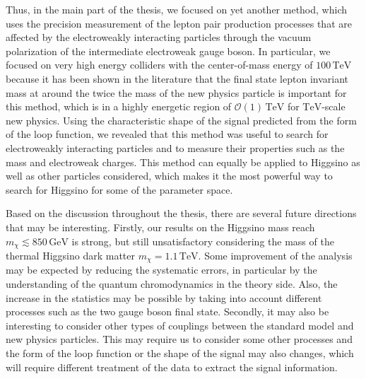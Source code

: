 \documentclass[12pt,twoside,book]{article}
\begin{document}
Thus, in the main part of the thesis, we focused on yet another method, which uses the precision measurement of the lepton pair production processes that are affected by the electroweakly interacting particles through the vacuum polarization of the intermediate electroweak gauge boson.
In particular, we focused on very high energy colliders with the center-of-mass energy of $100\,\mathrm{TeV}$ because it has been shown in the literature that the final state lepton invariant mass at around the twice the mass of the new physics particle is important for this method, which is in a highly energetic region of $\mathcal{O}(1)\,\mathrm{TeV}$ for $\mathrm{TeV}$-scale new physics.
Using the characteristic shape of the signal predicted from the form of the loop function, we revealed that this method was useful to search for electroweakly interacting particles and to measure their properties such as the mass and electroweak charges.
This method can equally be applied to Higgsino as well as other particles considered, which makes it the most powerful way to search for Higgsino for some of the parameter space.

Based on the discussion throughout the thesis, there are several future directions that may be interesting.
Firstly, our results on the Higgsino mass reach $m_\chi \lesssim 850\, \mathrm{GeV}$ is strong, but still unsatisfactory considering the mass of the thermal Higgsino dark matter $m_\chi = 1.1\,\mathrm{TeV}$.
Some improvement of the analysis may be expected by reducing the systematic errors, in particular by the understanding of the quantum chromodynamics in the theory side.
Also, the increase in the statistics may be possible by taking into account different processes such as the two gauge boson final state.
Secondly, it may also be interesting to consider other types of couplings between the standard model and new physics particles.
This may require us to consider some other processes and the form of the loop function or the shape of the signal may also changes, which will require different treatment of the data to extract the signal information.


\clearpage


\begin{appendices}



\clearpage



\clearpage



\clearpage



\clearpage



\clearpage



\end{appendices}

\clearpage



\end{document}
